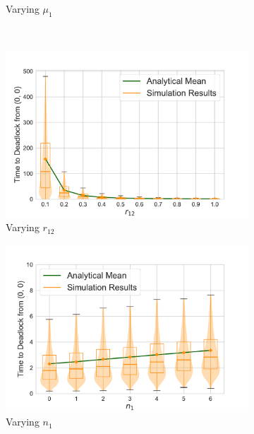 \documentclass{article}
\numberwithin{equation}{section}
\begin{document}
\begin{figure}[!htbp]
\begin{center}
\begin{subfigure}[b]{0.48\textwidth}
    \caption{Varying $\mu_1$}
    \label{fig:2Nms_mu}
  \end{subfigure}\\
  \begin{subfigure}[b]{0.48\textwidth}
    \includegraphics[width=\textwidth]{images/2Nms_varyr12}
    \caption{Varying $r_{12}$}
    \label{fig:2Nms_r11}
  \end{subfigure}
  \begin{subfigure}[b]{0.48\textwidth}
    \includegraphics[width=\textwidth]{images/2Nms_varyn1}
    \caption{Varying $n_1$}
    \label{fig:2Nms_n}
  \end{subfigure}\\
  \begin{subfigure}[b]{0.48\textwidth}

\end{subfigure}
\end{center}
\end{figure}
\end{document}
